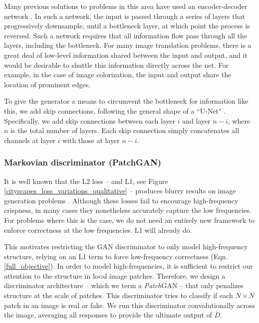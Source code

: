 \documentclass[10pt,twocolumn,letterpaper]{article}
\begin{document}
Many previous solutions \cite{pathak2016context, wang2016generative, johnson2016perceptual, zhou2016learning, yoo2016pixel} to problems in this area have used an encoder-decoder network \cite{hinton2006reducing}. In such a network, the input is passed through a series of layers that progressively downsample, until a bottleneck layer, at which point the process is reversed. Such a network requires that all information flow pass through all the layers, including the bottleneck. For many image translation problems, there is a great deal of low-level information shared between the input and output, and it would be desirable to shuttle this information directly across the net. For example, in the case of image colorization, the input and output share the location of prominent edges.

To give the generator a means to circumvent the bottleneck for information like this, we add skip connections, following the general shape of a ``U-Net" \cite{ronneberger2015u}. Specifically, we add skip connections between each layer $i$ and layer $n-i$, where $n$ is the total number of layers. Each skip connection simply concatenates all channels at layer $i$ with those at layer $n-i$.


\subsubsection{Markovian discriminator (PatchGAN)}
It is well known that the L2 loss -- and L1, see Figure \ref{cityscapes_loss_variations_qualitative} -- produces blurry results on image generation problems \cite{larsen2015autoencoding}. Although these losses fail to encourage high-frequency crispness, in many cases they nonetheless accurately capture the low frequencies. For problems where this is the case, we do not need an entirely new framework to enforce correctness at the low frequencies. L1 will already do.

This motivates restricting the GAN discriminator to only model high-frequency structure, relying on an L1 term to force low-frequency correctness (Eqn. \ref{full_objective}). In order to model high-frequencies, it is sufficient to restrict our attention to the structure in local image patches. Therefore, we design a discriminator architecture -- which we term a \emph{Patch}GAN -- that only penalizes structure at the scale of patches. This discriminator tries to classify if each $N \times N$ patch in an image is real or fake. We run this discriminator convolutionally across the image, averaging all responses to provide the ultimate output of $D$.
\end{document}
